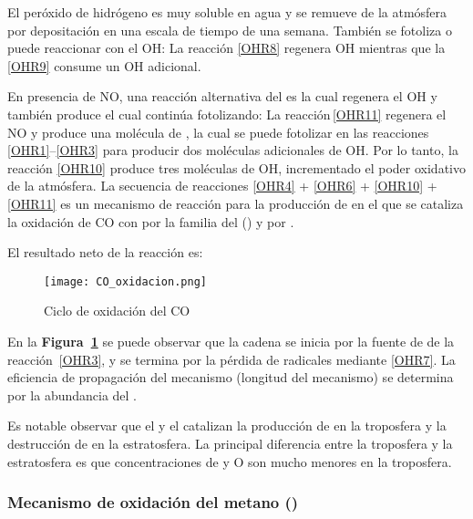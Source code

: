 
El peróxido de hidrógeno es muy soluble en agua y se remueve de la atmósfera por depositación en una escala de tiempo de una semana. También  se  fotoliza o puede  reaccionar con el OH:
La reacción \ref{OHR8} regenera OH mientras que la \ref{OHR9} consume un OH adicional.

En presencia de NO, una reacción alternativa del  es
la cual regenera el OH y también produce  el cual continúa fotolizando:
La reacción\,\ref{OHR11} regenera el NO y produce una molécula de , la cual se puede fotolizar en las reacciones \ref{OHR1}--\ref{OHR3} para producir dos moléculas adicionales de OH. Por lo tanto, la reacción \ref{OHR10} produce tres moléculas de OH, incrementado el poder oxidativo de la atmósfera. La secuencia de reacciones \ref{OHR4} + \ref{OHR6} + \ref{OHR10} + \ref{OHR11} es un mecanismo de reacción para la producción de  en el que se cataliza la oxidación de CO con  por la familia del   ()  y por .

El resultado neto de la reacción es:
\begin{figure}[htbp]
\begin{center}
\texttt{[image: CO\_oxidacion.png]}
\caption{Ciclo de oxidación del CO}
\label{CO_ox}
\end{center}
\end{figure}

En la \textbf{Figura~\ref{CO_ox}} se puede observar que la cadena se inicia por la fuente de  de la reacción~\ref{OHR3}, y se termina por la pérdida de radicales  mediante \ref{OHR7}. La eficiencia de propagación del mecanismo (longitud del mecanismo) se determina por la abundancia del .

Es notable observar que el  y el  catalizan la producción de  en la troposfera y la destrucción de  en la estratosfera. La principal diferencia entre la troposfera y la estratosfera es que concentraciones de  y O son mucho menores en la troposfera.

\subsubsection{Mecanismo de oxidaci\'on del metano ()}

